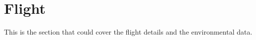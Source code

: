 \section{Flight}
\label{sec:Flight}
This is the section that could cover the flight details and the environmental data.
